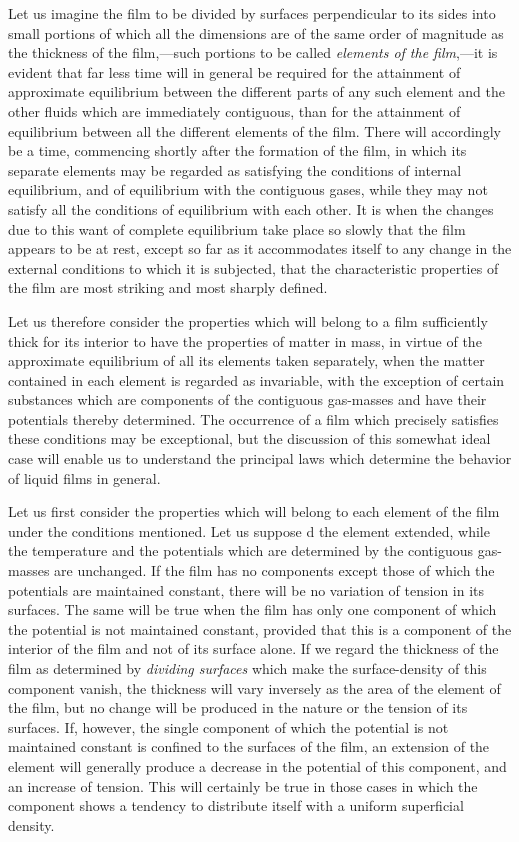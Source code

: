 \documentclass[12pt]{memoir}
\begin{document}
Let us imagine the film to be divided by surfaces perpendicular to its sides into small portions of which all the dimensions are of the same order of magnitude as the thickness of the film,---such portions to be called \textit{elements of the film},---it is evident that far less time will in general be required for the attainment of approximate equilibrium between the different parts of any such element and the other fluids which are immediately contiguous, than for the attainment of equilibrium between all the different elements of the film. There will accordingly be a time, commencing shortly after the formation of the film, in which its separate elements may be regarded as satisfying the conditions of internal equilibrium, and of equilibrium with the contiguous gases, while they may not satisfy all the conditions of equilibrium with each other. It is when the changes due to this want of complete equilibrium take place so slowly that the film appears to be at rest, except so far as it accommodates itself to any change in the external conditions to which it is subjected, that the characteristic properties of the film are most striking and most sharply defined.

Let us therefore consider the properties which will belong to a film sufficiently thick for its interior to have the properties of matter in mass, in virtue of the approximate equilibrium of all its elements taken separately, when the matter contained in each element is regarded as invariable, with the exception of certain substances which are components of the contiguous gas-masses and have their potentials thereby determined. The occurrence of a film which precisely satisfies these conditions may be exceptional, but the discussion of this somewhat ideal case will enable us to understand the principal laws which determine the behavior of liquid films in general.

Let us first consider the properties which will belong to each element of the film under the conditions mentioned. Let us suppose d the element extended, while the temperature and the potentials which are determined by the contiguous gas-masses are unchanged. If the film has no components except those of which the potentials are maintained constant, there will be no variation of tension in its surfaces. The same will be true when the film has only one component of which the potential is not maintained constant, provided that this is a component of the interior of the film and not of its surface alone. If we regard the thickness of the film as determined by \textit{dividing surfaces} which make the surface-density of this component vanish, the thickness will vary inversely as the area of the element of the film, but no change will be produced in the nature or the tension of its surfaces. If, however, the single component of which the potential is not maintained constant is confined to the surfaces of the film, an extension of the element will generally produce a decrease in the potential of this component, and an increase of tension. This will certainly be true in those cases in which the component shows a tendency to distribute itself with a uniform superficial density.
\end{document}
